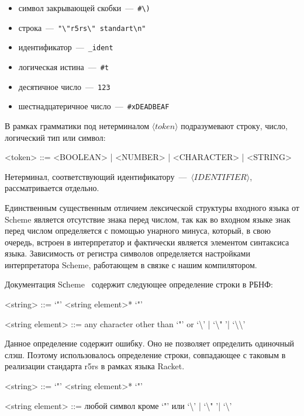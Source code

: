 \documentclass[12pt,a4paper,oneside]{extarticle}
\begin{document}
            \begin{itemize}
                \item символ закрывающей скобки~---~\lstinline$#\)$
                \item строка~---~\lstinline$"\"r5rs\" standart\n"$
                \item идентификатор~---~\lstinline$_ident$
                \item логическая истина~---~\lstinline$#t$
                \item десятичное число~---~\lstinline$123$
                \item шестнадцатеричное число~---~\lstinline$#xDEADBEAF$
            \end{itemize}

            В рамках грамматики под нетерминалом $\langle token\rangle$ подразумевают строку, число, логический тип или символ:
            \begin{grammar}
                <token> ::= <BOOLEAN> | <NUMBER> | <CHARACTER> | <STRING>
            \end{grammar}
            Нетерминал, соответствующий идентификатору~---~$\langle IDENTIFIER \rangle$, рассматривается отдельно.

            Единственным существенным отличием лексической структуры входного языка от Scheme является отсутствие знака перед числом, так как во входном языке знак перед числом определяется с помощью унарного минуса, который, в свою очередь, встроен в интерпретатор и фактически является элементом синтаксиса языка.
            Зависимость от регистра символов определяется настройками интерпретатора Scheme, работающем в связке с нашим компилятором.            

            Документация Sсheme~\cite{r5rs} содержит следующее определение строки в РБНФ:
            \begin{grammar}
                <string> ::= `"' <string element>* `"'

                <string element> ::= any character other than `"' or `\textbackslash' | `\textbackslash " '| `\textbackslash \textbackslash'
            \end{grammar}
            Данное определение содержит ошибку.
            Оно не позволяет определить одиночный слэш.
            Поэтому использовалось определение строки, совпадающее с таковым в реализации стандарта r5rs в рамках языка Racket. 
            \begin{grammar}
                <string> ::= `"' <string element>* `"'

                <string element> ::= любой символ кроме `"' или `\textbackslash' | `\textbackslash " '| `\textbackslash'
            \end{grammar}
\end{document}
